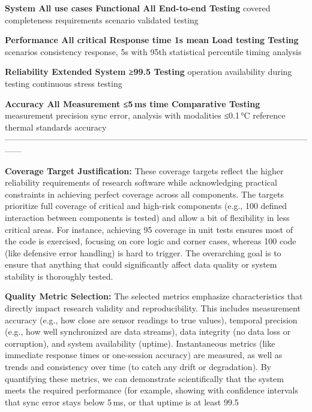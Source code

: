   \textbf{System        All use cases  Functional     All            End-to-end
  Testing}       covered        completeness   requirements   scenario
                                                validated      testing

  \textbf{Performance   All critical   Response time  \<1s mean      Load testing
  Testing}       scenarios      consistency    response, \<5s with
                                                95th           statistical
                                                percentile     timing analysis

  \textbf{Reliability   Extended       System         ≥99.5%
  Testing}       operation      availability   during testing continuous
                                                               stress testing

  \textbf{Accuracy      All            Measurement    ≤5 ms time     Comparative
  Testing}       measurement    precision      sync error,    analysis with
                  modalities                    ≤0.1 °C        reference
                                                thermal        standards
                                                accuracy       
  ------------------------------------------------------------------------------------------------------------------

\textbf{Coverage Target Justification:} These coverage targets reflect the
higher reliability requirements of research software while acknowledging
practical constraints in achieving perfect coverage across all
components\cite{ElectrodermalActivityWiki}.
The targets prioritize full coverage of critical and high-risk
components (e.g., 100%
defined interaction between components is tested) and allow a bit of
flexibility in less critical areas. For instance, achieving 95%
coverage in unit tests ensures most of the code is exercised, focusing
on core logic and corner cases, whereas 100%
code (like defensive error handling) is hard to trigger. The overarching
goal is to ensure that anything that could significantly affect data
quality or system stability is thoroughly tested.

\textbf{Quality Metric Selection:} The selected metrics emphasize
characteristics that directly impact research validity and
reproducibility\cite{DeviceServer}.
This includes measurement accuracy (e.g., how close are sensor readings
to true values), temporal precision (e.g., how well synchronized are
data streams), data integrity (no data loss or corruption), and system
availability (uptime). Instantaneous metrics (like immediate response
times or one-session accuracy) are measured, as well as trends and
consistency over time (to catch any drift or degradation). By
quantifying these metrics, we can demonstrate scientifically that the
system meets the required performance (for example, showing with
confidence intervals that sync error stays below 5 ms, or that uptime is
at least 99.5%

